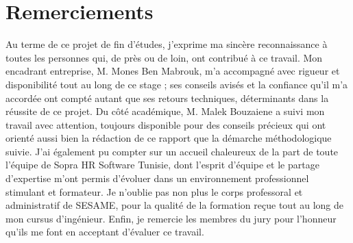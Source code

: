 \chapter*{Remerciements}

Au terme de ce projet de fin d’études, j’exprime ma sincère reconnaissance à toutes les personnes qui, de près ou de loin, ont contribué à ce travail.
Mon encadrant entreprise, M. Mones Ben Mabrouk, m’a accompagné avec rigueur et disponibilité tout au long de ce stage ; ses conseils avisés et la confiance qu’il m’a accordée ont compté autant que ses retours techniques, déterminants dans la réussite de ce projet.
Du côté académique, M. Malek Bouzaiene a suivi mon travail avec attention, toujours disponible pour des conseils précieux qui ont orienté aussi bien la rédaction de ce rapport que la démarche méthodologique suivie.
J’ai également pu compter sur un accueil chaleureux de la part de toute l’équipe de Sopra HR Software Tunisie, dont l’esprit d’équipe et le partage d’expertise m’ont permis d’évoluer dans un environnement professionnel stimulant et formateur.
Je n’oublie pas non plus le corps professoral et administratif de SESAME, pour la qualité de la formation reçue tout au long de mon cursus d’ingénieur.
Enfin, je remercie les membres du jury pour l’honneur qu’ils me font en acceptant d’évaluer ce travail.
